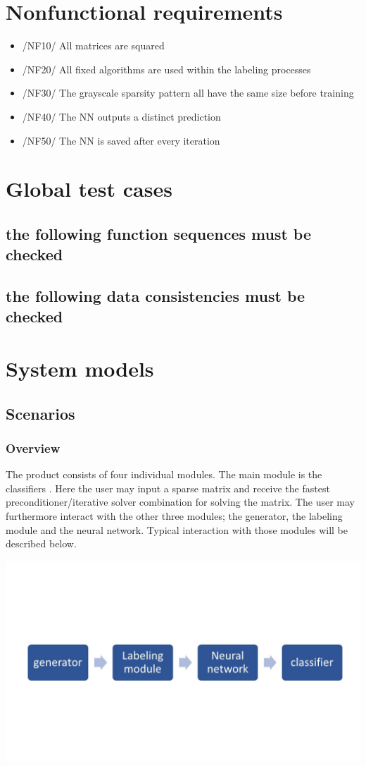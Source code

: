 \documentclass[parskip=full]{scrartcl}
\begin{document}
\section{Nonfunctional requirements}
	\begin{itemize}
		\item /NF10/ All matrices are squared
		\item /NF20/ All fixed algorithms are used within the labeling processes
		\item /NF30/ The grayscale sparsity pattern all have the same size before training
		\item /NF40/ The NN outputs a distinct prediction
		\item /NF50/ The NN is saved after every iteration
	\end{itemize}
	

\section{Global test cases}
\subsection{the following function sequences must be checked}
\subsection{the following data consistencies must be checked}
\newpage
\section{System models}
\subsection{Scenarios}
\subsubsection{Overview}
The product consists of four individual modules. The main module is the \glspl{classifier} . Here the user may input a sparse matrix and receive the fastest preconditioner/iterative solver combination for solving the matrix. The user may furthermore interact with the other three modules; the generator, the labeling module and the neural network.  Typical interaction with those modules will be described below.
\begin{center}
\includegraphics[width=\textwidth]{workflow}
\end{center}
\end{document}
